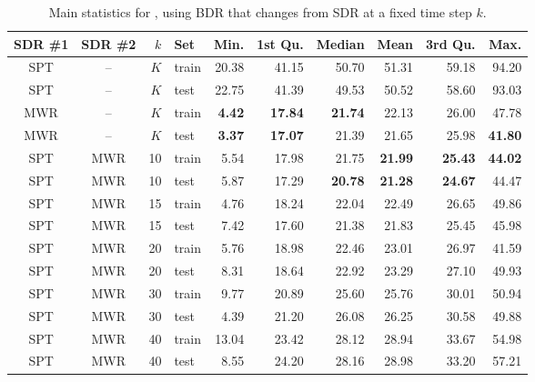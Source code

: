 \begin{table*}[t]
\caption{Main statistics for  \namerho, using BDR that changes 
from SDR at a fixed time step $k$.}\label{tbl:BDR:stats} 
\centering
\begin{tabular}{ccrlrrrrrr}
  \toprule
  SDR \#1 & SDR \#2 & $k$ & Set & Min. & 1st Qu. & Median & Mean & 
    3rd Qu. & Max. \\ \midrule
  SPT & -- & $K$ & train & 20.38 & 41.15 & 50.70 & 51.31 & 59.18 & 94.20 \\ 
  SPT & -- & $K$ & test & 22.75 & 41.39 & 49.53 & 50.52 & 58.60 & 93.03 \\ 
  MWR & -- & $K$ & train & \textbf{4.42} & \textbf{17.84} & \textbf{21.74} & 
  22.13 & 26.00 & 47.78 \\ 
  MWR & -- & $K$ & test & \textbf{3.37} & \textbf{17.07} & 21.39 & 21.65 & 
  25.98 & \textbf{41.80} \\ 
  SPT & MWR & 10 & train & 5.54 & 17.98 & 21.75 & \textbf{21.99} & 
  \textbf{25.43} & \textbf{44.02} \\ 
  SPT & MWR & 10 & test & 5.87 & 17.29 & \textbf{20.78} & \textbf{21.28} & 
  \textbf{24.67} & 44.47 \\ 
  SPT & MWR & 15 & train & 4.76 & 18.24 & 22.04 & 22.49 & 26.65 & 49.86 \\ 
  SPT & MWR & 15 & test & 7.42 & 17.60 & 21.38 & 21.83 & 25.45 & 45.98 \\ 
  SPT & MWR & 20 & train & 5.76 & 18.98 & 22.46 & 23.01 & 26.97 & 41.59 \\ 
  SPT & MWR & 20 & test & 8.31 & 18.64 & 22.92 & 23.29 & 27.10 & 49.93 \\ 
  SPT & MWR & 30 & train & 9.77 & 20.89 & 25.60 & 25.76 & 30.01 & 50.94 \\ 
  SPT & MWR & 30 & test & 4.39 & 21.20 & 26.08 & 26.25 & 30.58 & 49.88 \\ 
  SPT & MWR & 40 & train & 13.04 & 23.42 & 28.12 & 28.94 & 33.67 & 54.98 \\ 
  SPT & MWR & 40 & test & 8.55 & 24.20 & 28.16 & 28.98 & 33.20 & 57.21 \\ 
  \bottomrule
\end{tabular}
\end{table*}